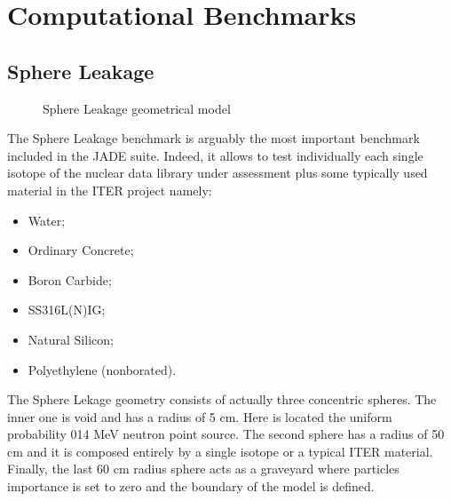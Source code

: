 \documentclass[letterpaper,10pt,english]{sphinxmanual}
\begin{document}
\section{Computational Benchmarks}
\label{\detokenize{usage/benchmarks:computational-benchmarks}}

\subsection{Sphere Leakage}
\label{\detokenize{usage/benchmarks:sphere-leakage}}
\begin{figure}[htbp]
\centering
\capstart

\noindent{}
\caption{Sphere Leakage geometrical model}\label{\detokenize{usage/benchmarks:id1}}\end{figure}

The Sphere Leakage benchmark is arguably the most important
benchmark included in the JADE suite. Indeed, it allows to test
individually each single isotope of the nuclear data library under assessment
plus some typically used material in the ITER project namely:
\begin{itemize}
\item {} 
Water;

\item {} 
Ordinary Concrete;

\item {} 
Boron Carbide;

\item {} 
SS316L(N)\sphinxhyphen{}IG;

\item {} 
Natural Silicon;

\item {} 
Polyethylene (non\sphinxhyphen{}borated).

\end{itemize}

The Sphere Lekage geometry consists of actually three
concentric spheres. The inner one is void and has a radius of 5 cm. Here
is located the uniform probability 0\sphinxhyphen{}14 MeV neutron point source. The second sphere
has a radius of 50 cm and it is composed entirely by a single isotope
or a typical ITER material. Finally,
the last 60 cm radius sphere acts as a graveyard where particles importance is
set to zero and the boundary of the model is defined.



\end{document}
